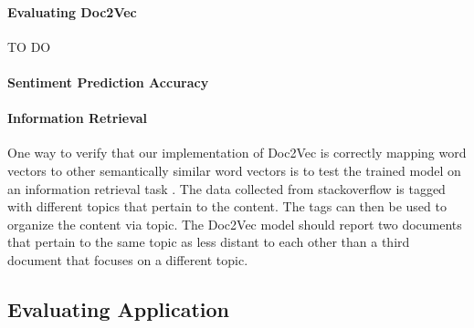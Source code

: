 \paragraph{Evaluating Doc2Vec}
TO DO

\paragraph{Sentiment Prediction Accuracy}
%
%
%
%

\paragraph{Information Retrieval}

One way to verify that our implementation of Doc2Vec is correctly mapping word vectors to other semantically similar word vectors is to test the trained model on an information retrieval task . \cite{RefWorks:doc:5a6e5746e4b0d609eec798d7} The data collected from stackoverflow is tagged with different topics that pertain to the content. The tags can then be used to organize the content via topic. The Doc2Vec model should report two documents that pertain to the same topic as less distant to each other than a third document that focuses on a different topic.

%
\subsection{Evaluating Application}
